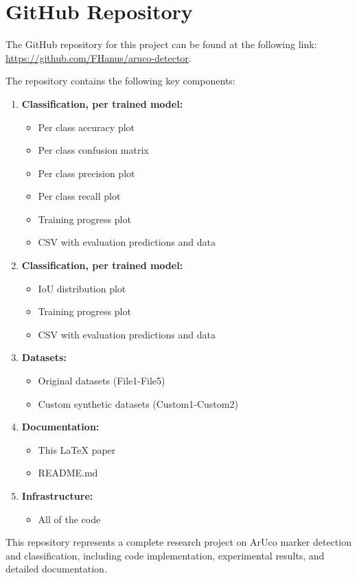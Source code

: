 \documentclass[conference]{IEEEtran}
\begin{document}
\printbibsection

\appendices

\renewcommand{\thesection}{\Alph{section}}

\section{GitHub Repository}

The GitHub repository for this project can be found at the following link: \url{https://github.com/FHanus/aruco-detector}.

The repository contains the following key components:

\begin{enumerate}
    \item \textbf{Classification, per trained model:}
    \begin{itemize}
        \item Per class accuracy plot
        \item Per class confusion matrix
        \item Per class precision plot
        \item Per class recall plot
        \item Training progress plot
        \item CSV with evaluation predictions and data
    \end{itemize}

    \item \textbf{Classification, per trained model:}
    \begin{itemize}
        \item IoU distribution plot
        \item Training progress plot
        \item CSV with evaluation predictions and data
    \end{itemize}

    \item \textbf{Datasets:}
    \begin{itemize}
        \item Original datasets (File1-File5)
        \item Custom synthetic datasets (Custom1-Custom2)
    \end{itemize}

    \item \textbf{Documentation:}
    \begin{itemize}
        \item This LaTeX paper
        \item README.md
    \end{itemize}

    \item \textbf{Infrastructure:}
    \begin{itemize}
        \item All of the code
    \end{itemize}
\end{enumerate}

This repository represents a complete research project on ArUco marker detection and classification, including code implementation, experimental results, and detailed documentation.
\end{document}
